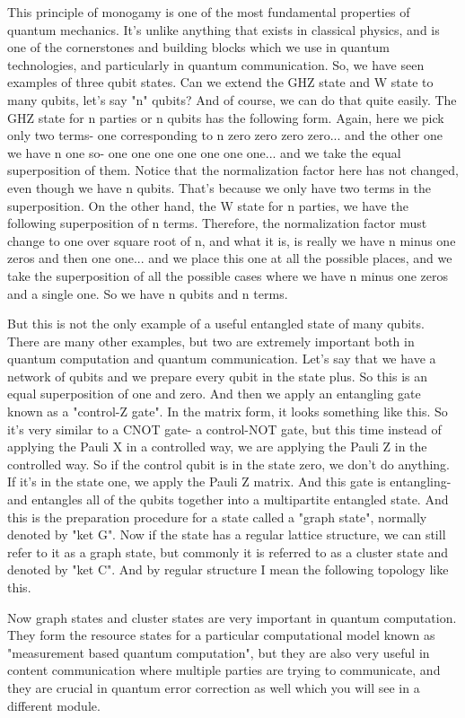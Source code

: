 This principle of monogamy is one of the most fundamental properties of quantum mechanics. It's unlike anything that exists in classical physics, and is one of the cornerstones and building blocks which we use in quantum technologies, and particularly in quantum communication. So, we have seen examples of three qubit states. Can we extend the GHZ state and W state to many qubits, let's say "n" qubits? And of course, we can do that quite easily. The GHZ state for n parties or n qubits has the following form. Again, here we pick only two terms- one corresponding to n zero zero zero zero... and the other one we have n one so- one one one one one one one... and we take the equal superposition of them. Notice that the normalization factor here has not changed, even though we have n qubits. That's because we only have two terms in the superposition. On the other hand, the W state for n parties, we have the following superposition of n terms. Therefore, the normalization factor must change to one over square root of n, and what it is, is really we have n minus one zeros and then one one... and we place this one at all the possible places, and we take the superposition of all the possible cases where we have n minus one zeros and a single one. So we have n qubits and n terms.

But this is not the only example of a useful entangled state of many qubits. There are many other examples, but two are extremely important both in quantum computation and quantum communication. Let's say that we have a network of qubits and we prepare every qubit in the state plus. So this is an equal superposition of one and zero. And then we apply an entangling gate known as a "control-Z gate". In the matrix form, it looks something like this. So it's very similar to a CNOT gate- a control-NOT gate, but this time instead of applying the Pauli X in a controlled way, we are applying the Pauli Z in the controlled way. So if the control qubit is in the state zero, we don't do anything. If it's in the state one, we apply the Pauli Z matrix. And this gate is entangling- and entangles all of the qubits together into a multipartite entangled state. And this is the preparation procedure for a state called a "graph state", normally denoted by "ket G". Now if the state has a regular lattice structure, we can still refer to it as a graph state, but commonly it is referred to as a cluster state and denoted by "ket C". And by regular structure I mean the following topology like this.

Now graph states and cluster states are very important in quantum computation. They form the resource states for a particular computational model known as "measurement based quantum computation", but they are also very useful in content communication where multiple parties are trying to communicate, and they are crucial in quantum error correction as well which you will see in a different module.



